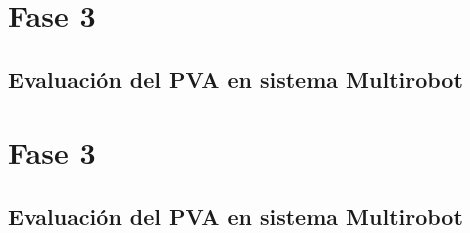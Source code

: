 \section{Fase 3}
\subsection{Evaluación del PVA en sistema Multirobot}
\section{Fase 3}
\subsection{Evaluación del PVA en sistema Multirobot}
